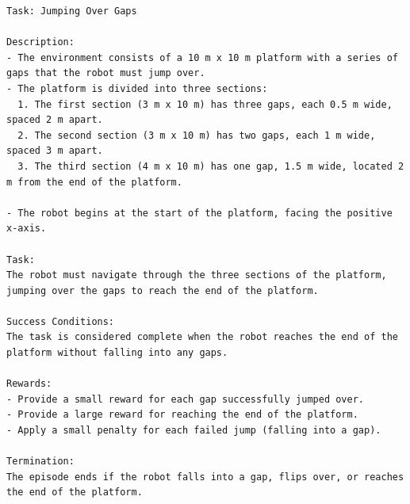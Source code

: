 \begin{lstlisting}[language={}]
Task: Jumping Over Gaps

Description:
- The environment consists of a 10 m x 10 m platform with a series of gaps that the robot must jump over.
- The platform is divided into three sections:
  1. The first section (3 m x 10 m) has three gaps, each 0.5 m wide, spaced 2 m apart.
  2. The second section (3 m x 10 m) has two gaps, each 1 m wide, spaced 3 m apart.
  3. The third section (4 m x 10 m) has one gap, 1.5 m wide, located 2 m from the end of the platform.

- The robot begins at the start of the platform, facing the positive x-axis.

Task:
The robot must navigate through the three sections of the platform, jumping over the gaps to reach the end of the platform.

Success Conditions:
The task is considered complete when the robot reaches the end of the platform without falling into any gaps.

Rewards:
- Provide a small reward for each gap successfully jumped over.
- Provide a large reward for reaching the end of the platform.
- Apply a small penalty for each failed jump (falling into a gap).

Termination:
The episode ends if the robot falls into a gap, flips over, or reaches the end of the platform.
\end{lstlisting}
